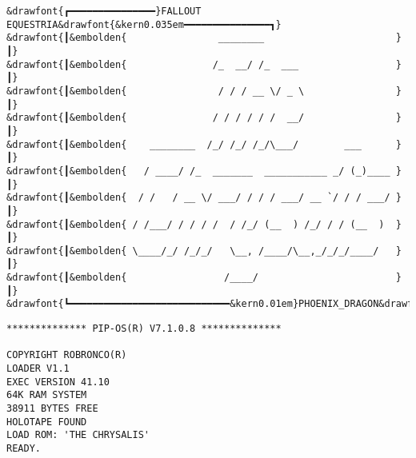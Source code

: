 


\SetTrimSize{148mm}{210mm}
\SetMargins{14mm}{18mm}{20mm}{18mm}


\frontmatter

\thispagestyle{empty}

\newpage
\thispagestyle{empty}
\begin{center}
\def\embolden#1{%
	\pdfextension literal direct {2 Tr 1.2 w}%
	#1%
	\pdfextension literal direct {0 Tr 0 w}%
}
\null\vspace{2\baselineskip}
\begin{parascale}[0.8]
\setmonofont{IBMPlexMono}
\begin{BVerbatim}[baseline=t,commandchars=\&\{\}]
&drawfont{┏━━━━━━━━━━━━━━━}FALLOUT EQUESTRIA&drawfont{&kern0.035em━━━━━━━━━━━━━━━┓}
&drawfont{┃&embolden{                ________                       }┃}
&drawfont{┃&embolden{               /_  __/ /_  ___                 }┃}
&drawfont{┃&embolden{                / / / __ \/ _ \                }┃}
&drawfont{┃&embolden{               / / / / / /  __/                }┃}
&drawfont{┃&embolden{    ________  /_/ /_/ /_/\___/        ___      }┃}
&drawfont{┃&embolden{   / ____/ /_  _______  ___________ _/ (_)____ }┃}
&drawfont{┃&embolden{  / /   / __ \/ ___/ / / / ___/ __ `/ / / ___/ }┃}
&drawfont{┃&embolden{ / /___/ / / / /  / /_/ (__  ) /_/ / / (__  )  }┃}
&drawfont{┃&embolden{ \____/_/ /_/_/   \__, /____/\__,_/_/_/____/   }┃}
&drawfont{┃&embolden{                 /____/                        }┃}
&drawfont{┗━━━━━━━━━━━━━━━━━━━━━━━━━━━━&kern0.01em}PHOENIX_DRAGON&drawfont{&kern0.02em━━━━━┛}
\end{BVerbatim}
\end{parascale}
\vspace{0.091\nbs}
\vspace{12\baselineskip}
\begin{BVerbatim}[baseline=t]
************** PIP-OS(R) V7.1.0.8 **************

COPYRIGHT ROBRONCO(R)
LOADER V1.1
EXEC VERSION 41.10
64K RAM SYSTEM
38911 BYTES FREE
HOLOTAPE FOUND
LOAD ROM: 'THE CHRYSALIS'
READY.
\end{BVerbatim}
\end{center}

